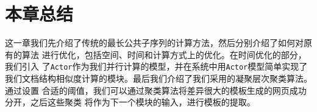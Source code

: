 \section{本章总结}
\label{sec:summarycluster}
这一章我们先介绍了传统的最长公共子序列的计算方法，然后分别介绍了如何对原有的算法
进行优化，包括空间、时间和计算方式上的优化。在时间优化的部分，我们引入
了\texttt{Actor}作为我们并行计算的模型，并在系统中用\texttt{Actor}模型简单实现了
我们文档结构相似度计算的模块。最后我们介绍了我们采用的凝聚层次聚类算法。通过设置
合适的阈值，我们可以通过聚类算法将差异很大的模板生成的网页成功分开，之后这些聚类
将作为下一个模块的输入，进行模板的提取。
